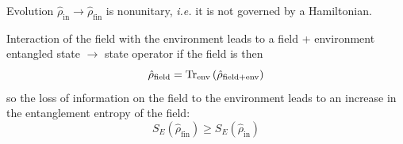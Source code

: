 \documentclass[12pt]{article}
\newcommand{\be}{\begin{equation}}
\newcommand{\ee}{\end{equation}}
\begin{document}
Evolution $\hat{\rho}_{\text {in}} \rightarrow \hat{\rho}_{\text {fin}}$ is nonunitary, 
\textit{i.e.} it is not governed by a Hamiltonian.

Interaction of the field with the environment leads
to a field + environment entangled state
$\rightarrow$ state operator if the field is then
\be
\hat{\rho}_{\text{field}}=\Tr_{\text{env}}\left(\hat{\rho}_{\text{field+env}}\right)
\ee
so the loss of information on the field to
the environment leads to an
increase in the entanglement entropy
of the field:
\be
S_{E}\left(\hat{\rho}_{\text{fin}}\right) \geqslant S_{E}\left(\hat{\rho}_{\text{in}}\right)
\ee
\end{document}
